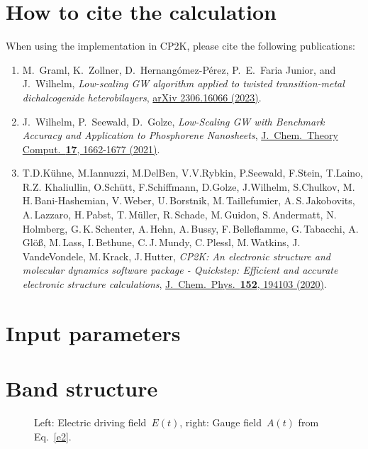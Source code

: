 \documentclass[11pt, a4paper]{scrartcl}
\newlength\figureheight
\newlength\figurewidth
\begin{document}
\section{How to cite the \GW calculation}
When using the \GW implementation in CP2K, please cite the following publications:
\begin{enumerate}[leftmargin=*]

\item M.~Graml, K.~Zollner, D.~Hernangómez-Pérez, P.~E.~Faria Junior, and J.~Wilhelm, \textit{Low-scaling GW algorithm applied to twisted transition-metal dichalcogenide heterobilayers}, \href{
https://doi.org/10.48550/arXiv.2306.16066}{arXiv 2306.16066 (2023)}.

\item J.~Wilhelm, P.~Seewald, D.~Golze, \textit{Low-Scaling GW with Benchmark Accuracy and Application to Phosphorene Nanosheets}, \href{https://doi.org/10.1021/acs.jctc.0c01282}{
J.~Chem.~Theory Comput.~\textbf{17}, 1662-1677 (2021)}.


\item T.\;D.\;Kühne, M.\;Iannuzzi, M.\;Del\;Ben, V.\;V.\;Rybkin, P.\;Seewald, F.\;Stein, T.\;Laino, R.\;Z. Khaliullin, O.\;Schütt, F.\;Schiffmann, D.\;Golze, J.\;Wilhelm, S.\;Chulkov, M.\,H.\,Bani-Hashe\-mian, V.\,Weber, \linebreak U.\,Borst\-nik, M.\,Taillefumier, A.\,S.\,Jakobovits, A.\,Lazzaro, H.\,Pabst,  T.\,Müller,  R.\,Schade, M.\,Guidon, S.\,Ander\-matt, N.\,Holmberg, G.\,K.\,Schenter, A.\,Hehn, A.\,Bussy,  F.\,Belleflamme, G.\,Tabacchi, A.\,Glöß, M.\,Lass, I.\,Bethune, C.\,J.\,Mundy, C.\,Plessl, M.\,Watkins, J.\,VandeVondele, M.\,Krack, J.\,Hutter, \textit{CP2K: An electronic structure and molecular dynamics software package - Quickstep: Efficient and accurate electronic structure calculations}, \href{https://doi.org/10.1063/5.0007045}{J.~Chem.~Phys.~\textbf{152}, 194103 (2020)}.


\end{enumerate}

\section{Input parameters}


\section{Band structure}
\begin{figure}[b!]
\centering
\setlength\figureheight{7.5cm} 
\setlength\figurewidth{7.5cm}

\caption{Left: Electric driving field~$E(t)$, right: Gauge field~$A(t)$ from Eq.~\eqref{e2}.}
    \label{fig:Efield}
\end{figure}
\end{document}
